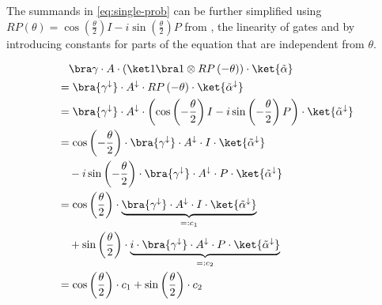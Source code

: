 The summands in \autoref{eq:single-prob} can be further simplified using
$RP\left(\theta\right) = \cos\left(\frac\theta2\right) I - i \sin\left(\frac\theta2\right) P$
from \cite{ostaszewski_structure_2021}, the linearity of gates and by
introducing constants for parts of the equation that are independent from
$\theta$.

\begin{equation}
    \label{eq:single-prob-simplification1}
    \begin{split}
            &\quad \bra\gamma \cdot A \cdot (\ket 1 \bra 1 \otimes RP\left(-\theta\right)) \cdot \ket{\tilde\alpha} \\
            &= \bra{\gamma^\downarrow} \cdot A^\downarrow \cdot RP\left(-\theta\right) \cdot \ket{\tilde\alpha^\downarrow} \\
            &= \bra{\gamma^\downarrow} \cdot A^\downarrow \cdot \left(\cos\left(-\frac\theta2\right) I - i \sin\left(-\frac\theta2\right) P\right) \cdot \ket{\tilde\alpha^\downarrow} \\
            &= \cos\left(-\frac\theta2\right) \cdot \bra{\gamma^\downarrow} \cdot A^\downarrow \cdot I \cdot \ket{\tilde\alpha^\downarrow} \\
                &\quad - i \sin\left(-\frac\theta2\right) \cdot \bra{\gamma^\downarrow} \cdot A^\downarrow \cdot P \cdot \ket{\tilde\alpha^\downarrow} \\
            &= \cos\left(\frac\theta2\right) \cdot \underbrace{\bra{\gamma^\downarrow} \cdot A^\downarrow \cdot I \cdot \ket{\tilde\alpha^\downarrow}}_{=: c_1} \\
                &\quad + \sin\left(\frac\theta2\right) \cdot \underbrace{i \cdot \bra{\gamma^\downarrow} \cdot A^\downarrow \cdot P \cdot \ket{\tilde\alpha^\downarrow}}_{=: c_2} \\
            &= \cos\left(\frac\theta2\right) \cdot c_1 + \sin\left(\frac\theta2\right) \cdot c_2
    \end{split}
\end{equation}

